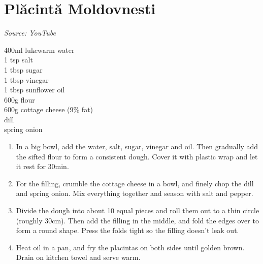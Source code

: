 \documentclass{report}
\begin{document}
\section[Plăcintă]{Plăcintă Moldovnesti}
\textit{Source: YouTube}\\
\begin{minipage}[t]{0.21\textwidth} \vspace{0pt} 
400ml lukewarm water\\
1 tsp salt\\
1 tbsp sugar\\
1 tbsp vinegar\\
1 tbsp sunflower oil\\
600g flour\\
600g cottage cheese (9\% fat)\\
dill\\
spring onion
\end{minipage}
\hfill
\begin{minipage}[t]{0.78\textwidth} \vspace{0pt}
	\begin{enumerate}
		\item In a big bowl, add the water, salt, sugar, vinegar and oil. Then gradually add the sifted flour to form a consistent dough. Cover it with plastic wrap and let it rest for 30min.
		\item For the filling, crumble the cottage cheese in a bowl, and finely chop the dill and spring onion. Mix everything together and season with salt and pepper.
		\item Divide the dough into about 10 equal pieces and roll them out to a thin circle (roughly 30cm). Then add the filling in the middle, and fold the edges over to form a round shape. Press the folds tight so the filling doesn't leak out.
		\item Heat oil in a pan, and fry the placintas on both sides until golden brown. Drain on kitchen towel and serve warm.
	\end{enumerate}	
\end{minipage}
\end{document}
